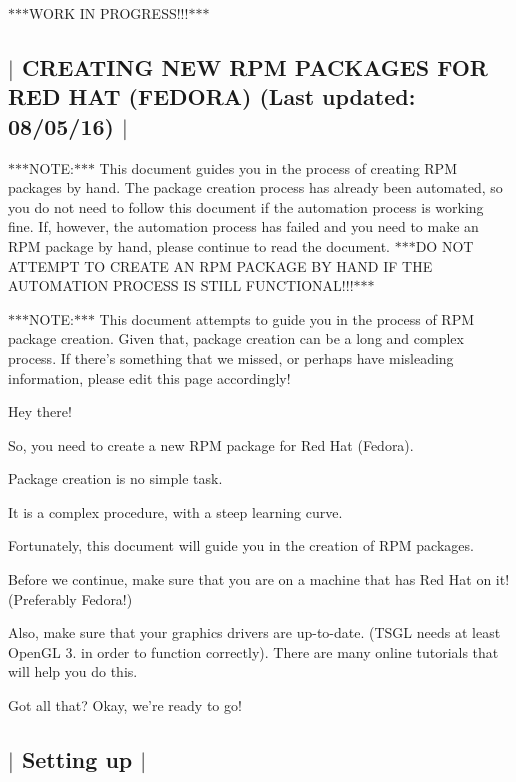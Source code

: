 $\ast$$\ast$$\ast$\-W\-O\-R\-K I\-N P\-R\-O\-G\-R\-E\-S\-S!!!$\ast$$\ast$$\ast$ 

 \subsection*{$\vert$ C\-R\-E\-A\-T\-I\-N\-G N\-E\-W R\-P\-M P\-A\-C\-K\-A\-G\-E\-S F\-O\-R R\-E\-D H\-A\-T (F\-E\-D\-O\-R\-A) (Last updated\-: 08/05/16) $\vert$ }

$\ast$$\ast$$\ast$\-N\-O\-T\-E\-:$\ast$$\ast$$\ast$ This document guides you in the process of creating R\-P\-M packages by hand. The package creation process has already been automated, so you do not need to follow this document if the automation process is working fine. If, however, the automation process has failed and you need to make an R\-P\-M package by hand, please continue to read the document. $\ast$$\ast$$\ast$\-D\-O N\-O\-T A\-T\-T\-E\-M\-P\-T T\-O C\-R\-E\-A\-T\-E A\-N R\-P\-M P\-A\-C\-K\-A\-G\-E B\-Y H\-A\-N\-D I\-F T\-H\-E A\-U\-T\-O\-M\-A\-T\-I\-O\-N P\-R\-O\-C\-E\-S\-S I\-S S\-T\-I\-L\-L F\-U\-N\-C\-T\-I\-O\-N\-A\-L!!!$\ast$$\ast$$\ast$

$\ast$$\ast$$\ast$\-N\-O\-T\-E\-:$\ast$$\ast$$\ast$ This document attempts to guide you in the process of R\-P\-M package creation. Given that, package creation can be a long and complex process. If there's something that we missed, or perhaps have misleading information, please edit this page accordingly!

Hey there!

So, you need to create a new R\-P\-M package for Red Hat (Fedora).

Package creation is no simple task.

It is a complex procedure, with a steep learning curve.

Fortunately, this document will guide you in the creation of R\-P\-M packages.

Before we continue, make sure that you are on a machine that has Red Hat on it! (Preferably Fedora!)

Also, make sure that your graphics drivers are up-\/to-\/date. (T\-S\-G\-L needs at least Open\-G\-L 3. in order to function correctly). There are many online tutorials that will help you do this.

Got all that? Okay, we're ready to go! 

 \subsection*{$\vert$ Setting up $\vert$ }

